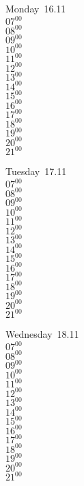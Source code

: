 \documentclass[11pt,a4paper]{book}\usepackage[]{graphicx}\usepackage[]{color}
\begin{document}
\begin{headerbox}
\end{headerbox}
\begin{weekdaybox}
  Monday~16.11\\
  { 
  \vfill
  $07^{00}$\\
$08^{00}$\\
$09^{00}$\\
$10^{00}$\\
$11^{00}$\\
$12^{00}$\\
$13^{00}$\\
$14^{00}$\\
$15^{00}$\\
$16^{00}$\\
$17^{00}$\\
$18^{00}$\\
$19^{00}$\\
$20^{00}$\\
$21^{00}$\\
  }
\end{weekdaybox}
\begin{weekdaybox}
  Tuesday~17.11\\
  { 
  \vfill
  $07^{00}$\\
$08^{00}$\\
$09^{00}$\\
$10^{00}$\\
$11^{00}$\\
$12^{00}$\\
$13^{00}$\\
$14^{00}$\\
$15^{00}$\\
$16^{00}$\\
$17^{00}$\\
$18^{00}$\\
$19^{00}$\\
$20^{00}$\\
$21^{00}$\\
  }
\end{weekdaybox}
\begin{weekdaybox}
  Wednesday~18.11\\
  { 
  \vfill
  $07^{00}$\\
$08^{00}$\\
$09^{00}$\\
$10^{00}$\\
$11^{00}$\\
$12^{00}$\\
$13^{00}$\\
$14^{00}$\\
$15^{00}$\\
$16^{00}$\\
$17^{00}$\\
$18^{00}$\\
$19^{00}$\\
$20^{00}$\\
$21^{00}$\\
  }
\end{weekdaybox}
\end{document}
